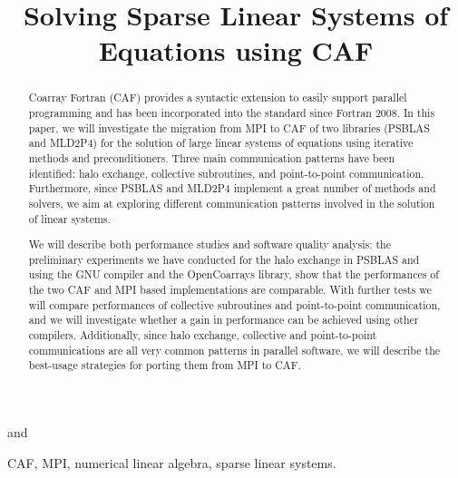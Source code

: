\documentclass{IOS-Book-Article}
\def\hb{\hbox to 10.7 cm{}}
\begin{document}
\pagestyle{headings}
\def\thepage{}

\begin{frontmatter}              %


\title{Solving Sparse Linear Systems of Equations using CAF}

\author[A]{}
\author[A]{}
and
\author[B]{}

\address[A]{University of Rome Tor Vergata, Rome, Italy}
\address[B]{Cranfield University, Cranfield, UK}

\begin{abstract}
Coarray Fortran (CAF) provides a syntactic extension to easily support parallel programming and  has been incorporated into the standard since Fortran 2008.
In this paper, we will investigate the migration from MPI to CAF of two libraries (PSBLAS and MLD2P4) for the solution of large linear systems of equations using iterative methods and preconditioners. Three main communication patterns have been identified: halo exchange, collective subroutines, and point-to-point communication. 
Furthermore, since PSBLAS and MLD2P4 implement a great number of methods and solvers, we aim at exploring different communication patterns involved in the solution of linear systems. 

We will describe both performance studies and software quality analysis: the preliminary experiments we have conducted for the halo exchange in PSBLAS and using the GNU compiler and the OpenCoarrays library, show that the performances of the two CAF and MPI based implementations are comparable. With further tests we will compare performances of collective subroutines and point-to-point communication, and we will investigate whether a gain in performance can be achieved using other compilers. Additionally, since halo exchange, collective and point-to-point communications are all very common patterns in parallel software, we will describe the best-usage strategies for porting them from MPI to CAF.

\end{abstract}

\begin{keyword}
CAF, MPI, numerical linear algebra, sparse linear systems.
\end{keyword}
\end{frontmatter}
\end{document}
